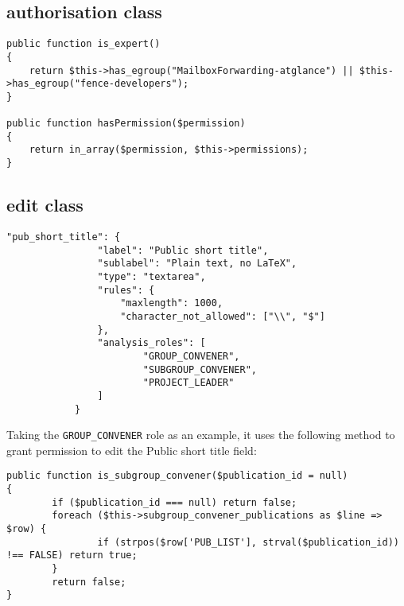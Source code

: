 \subsection{ authorisation class}%
\label{app:analysis:userauthorise}

\begin{lstlisting}
public function is_expert() 
{
    return $this->has_egroup("MailboxForwarding-atglance") || $this->has_egroup("fence-developers");
}

public function hasPermission($permission)
{
    return in_array($permission, $this->permissions);
}
\end{lstlisting}


\subsection{ edit class}%
\label{app:analysis:useredit}

\begin{lstlisting}
"pub_short_title": {
                "label": "Public short title",
                "sublabel": "Plain text, no LaTeX",
                "type": "textarea",
                "rules": {
                    "maxlength": 1000,
                    "character_not_allowed": ["\\", "$"]
                },
                "analysis_roles": [
                        "GROUP_CONVENER",
                        "SUBGROUP_CONVENER",
                        "PROJECT_LEADER"
                ]
            }
\end{lstlisting}

Taking the \texttt{GROUP\_CONVENER} role as an example, it uses the following method to grant permission to edit the Public short title field:

\begin{lstlisting}
public function is_subgroup_convener($publication_id = null)
{
        if ($publication_id === null) return false;
        foreach ($this->subgroup_convener_publications as $line => $row) {
                if (strpos($row['PUB_LIST'], strval($publication_id)) !== FALSE) return true;
        }
        return false;
}
\end{lstlisting}